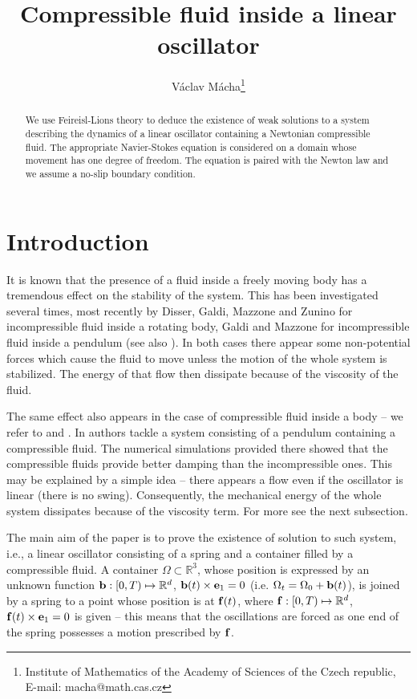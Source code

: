 \documentclass{article}
\title{Compressible fluid inside a linear oscillator}
\date{}
\author{V\' aclav M\' acha\footnote{Institute of Mathematics of the Academy of Sciences of the Czech republic,
E-mail: macha@math.cas.cz}}
\newcommand{\bb}{{\bf b}}
\newcommand{\be}{{\bf e}}
\numberwithin{equation}{section}
\begin{document}
\maketitle

\begin{abstract}
We use Feireisl-Lions theory to deduce the existence of weak solutions to a system describing the dynamics of a linear oscillator containing a Newtonian compressible fluid. The appropriate Navier-Stokes equation is considered on a domain whose movement has one degree of freedom. The equation is paired with the Newton law and we assume a no-slip boundary condition. 
\end{abstract}

\section{Introduction}

It is known that the presence of a fluid inside a freely moving body has a tremendous effect on the stability of the system. This has been investigated several times, most recently by Disser, Galdi, Mazzone and Zunino \cite{DiGaMaZu} for incompressible fluid inside a rotating body, Galdi and Mazzone \cite{GaMa} for incompressible fluid inside a pendulum (see also \cite{GaMaMo}). In both cases there appear some non-potential forces which cause the fluid to move unless the motion of the whole system is stabilized. The energy of that flow then dissipate because of the viscosity of the fluid.

The same effect also appears in the case of compressible fluid inside a body -- we refer to \cite{GaMaNe} and \cite{GaMaNeSh}. In \cite{GaMaNeSh} authors tackle a system consisting of a pendulum containing a compressible fluid. The numerical simulations provided there showed that the compressible fluids provide better damping than the incompressible ones. This may be explained by a simple idea -- there appears a flow even if the oscillator is linear (there is no swing). Consequently, the mechanical energy of the whole system dissipates because of the viscosity term. For more see the next subsection.

The main aim of the paper is to prove the existence of solution to such system, i.e., a linear oscillator consisting of a spring and a container filled by a compressible fluid.  A container $\Omega\subset \mathbb R^{3}$,  whose position is expressed by an unknown function $\bb:[0,T)\mapsto \mathbb R^d$, $\bb(t)\times\be_1  = 0$ (i.e. $\Omega_t =\Omega_0 + \bb(t)$), is joined by a spring to a point whose position is at ${\bf f}(t)$, where ${\bf f}:[0,T)\mapsto \mathbb R^d$, ${\bf f}(t)\times \be_1 = 0$ is given -- this means that the oscillations are forced as one end of the spring possesses a motion prescribed by ${\bf f}$. 
\end{document}
